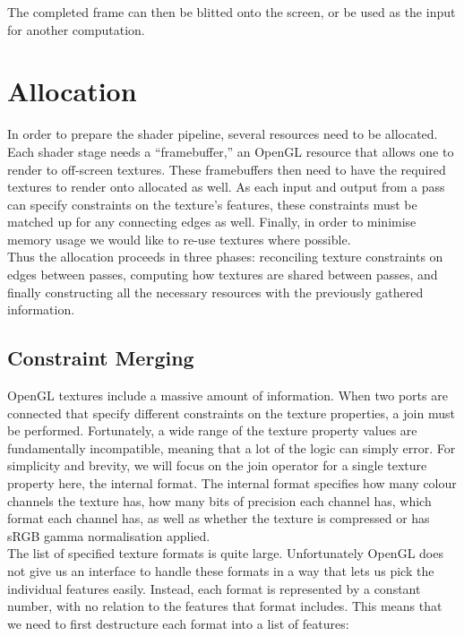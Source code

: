 \documentclass[format=sigconf]{acmart}
\begin{document}
The completed frame can then be blitted onto the screen, or be used as the input for another computation.

\section{Allocation}\label{allocation}
In order to prepare the shader pipeline, several resources need to be allocated. Each shader stage needs a ``framebuffer,'' an OpenGL resource that allows one to render to off-screen textures. These framebuffers then need to have the required textures to render onto allocated as well. As each input and output from a pass can specify constraints on the texture's features, these constraints must be matched up for any connecting edges as well. Finally, in order to minimise memory usage we would like to re-use textures where possible. \\

Thus the allocation proceeds in three phases: reconciling texture constraints on edges between passes, computing how textures are shared between passes, and finally constructing all the necessary resources with the previously gathered information.

\subsection{Constraint Merging}\label{texture-constraints}
OpenGL textures include a massive amount of information.\cite{texparameter}\cite{teximage2d} When two ports are connected that specify different constraints on the texture properties, a join must be performed. Fortunately, a wide range of the texture property values are fundamentally incompatible, meaning that a lot of the logic can simply error. For simplicity and brevity, we will focus on the join operator for a single texture property here, the internal format. The internal format specifies how many colour channels the texture has, how many bits of precision each channel has, which format each channel has, as well as whether the texture is compressed or has sRGB gamma normalisation applied. \\

The list of specified texture formats is quite large.\cite{texinternalformat} Unfortunately OpenGL does not give us an interface to handle these formats in a way that lets us pick the individual features easily. Instead, each format is represented by a constant number, with no relation to the features that format includes. This means that we need to first destructure each format into a list of features:
\end{document}
